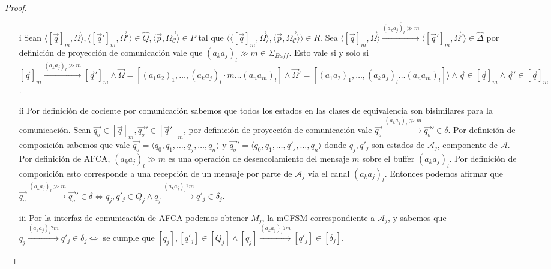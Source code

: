 \begin{proof}
\begin{itemize}
    \item[i] Sean $\langle [\overrightarrow{q}]_m, \overrightarrow{\Omega} \rangle, \langle [\overrightarrow{q}']_m, \overrightarrow{\Omega}' \rangle \in \hat{Q}, \langle \overrightarrow{p}, \overrightarrow{\Omega_\mathcal{C}} \rangle \in P$ tal que $\langle \langle [\overrightarrow{q}]_m, \overrightarrow{\Omega} \rangle, \langle \overrightarrow{p}, \overrightarrow{\Omega_\mathcal{C}} \rangle \rangle \in R$. Sea $\langle [\overrightarrow{q}]_m, \overrightarrow{\Omega} \rangle \xrightarrow{\hat{(a_ka_j)_l \gg m}} \langle [\overrightarrow{q}']_m, \overrightarrow{\Omega}' \rangle \in \hat{\Delta}$ por definición de proyección de comunicación vale que $(a_ka_j)_l \gg m \in \Sigma_{Buff}$.  Esto vale si y solo si $[\overrightarrow{q}]_m \xrightarrow{(a_ka_j)_l \gg m} [\overrightarrow{q}']_m \land \overrightarrow{\Omega} = [(a_1a_2)_1, \ldots, (a_ka_j)_l \cdot m \ldots (a_na_m)_l] \land \overrightarrow{\Omega}' = [(a_1a_2)_1, \ldots, (a_ka_j)_l \ldots (a_na_m)_l] \rangle \land \overrightarrow{q} \in [\overrightarrow{q}]_m \land \overrightarrow{q}' \in [\overrightarrow{q}]_m$.
    
    \item[ii] Por definición de cociente por comunicación sabemos que todos los estados en las clases de equivalencia son bisimilares para la comunicación. Sean $\overrightarrow{q_{\sigma}} \in [\overrightarrow{q}]_m, \overrightarrow{q_{\sigma}}' \in [\overrightarrow{q}']_m$, por definición de proyección de comunicación vale $\overrightarrow{q_{\sigma}} \xrightarrow{(a_ka_j)_l \gg m} \overrightarrow{q_{\sigma}}' \in \delta$. Por definición de composición sabemos que vale $\overrightarrow{q_{\sigma}} =\langle q_0, q_1, \ldots, q_j, \ldots,q_n \rangle$ y $\overrightarrow{q_{\sigma}}' =\langle q_0, q_1, \ldots, q'_j, \ldots,q_n \rangle$ donde $q_j,q'_j$ son estados de $\mathcal{A}_j$, componente de $\mathcal{A}$. Por definición de AFCA, $(a_ka_j)_l \gg m$ es una operación de desencolamiento del mensaje $m$ sobre el buffer $(a_ka_j)_l$. Por definición de composición esto corresponde a una recepción de un mensaje por parte de $\mathcal{A}_j$ vía el canal $(a_ka_j)_l$. Entonces podemos afirmar que $\overrightarrow{q_{\sigma}} \xrightarrow{(a_ka_j)_l \gg m} \overrightarrow{q_{\sigma}}'\in \delta \iff q_j,q'_j \in Q_j \land q_j \xrightarrow{(a_ka_j)_l?m} q'_j \in \delta_j$.
    
    \item[iii] Por la interfaz de comunicación de AFCA podemos obtener $M_j$, la mCFSM correspondiente a $\mathcal{A}_j$, y sabemos que $q_j \xrightarrow{(a_ka_j)_l?m} q'_j \in \delta_j \iff$ se cumple que $[q_j], [q'_j] \in [Q_j] \land [q_j] \xrightarrow{(a_ka_j)_l?m} [q'_j] \in [\delta_j]$.  
    

\end{itemize}
\end{proof}
